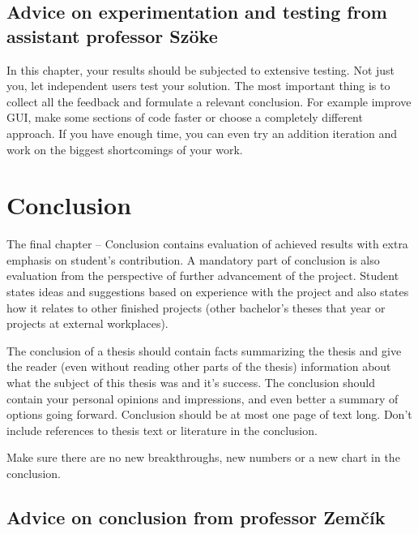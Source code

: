 \subsection*{Advice on experimentation and testing from assistant professor Szöke}
In this chapter, your results should be subjected to extensive testing. Not just you, let independent users test your solution. The most important thing is to collect all the feedback and formulate a relevant conclusion. For example improve GUI, make some sections of code faster or choose a completely different approach. If you have enough time, you can even try an addition iteration and work on the biggest shortcomings of your work.


\section{Conclusion}
\label{zaverPrace}

The final chapter -- Conclusion contains evaluation of achieved results with extra emphasis on student's contribution. A mandatory part of conclusion is also evaluation from the perspective of further advancement of the project. Student states ideas and suggestions based on experience with the project and also states how it relates to other finished projects (other bachelor's theses that year or projects at external workplaces).

The conclusion of a thesis should contain facts summarizing the thesis and give the reader (even without reading other parts of the thesis) information about what the subject of this thesis was and it's success. The conclusion should contain your personal opinions and impressions, and even better a summary of options going forward. Conclusion should be at most one page of text long. Don't include references to thesis text or literature in the conclusion.

Make sure there are no new breakthroughs, new numbers or a new chart in the conclusion.

\subsection*{Advice on conclusion from professor Zemčík}

